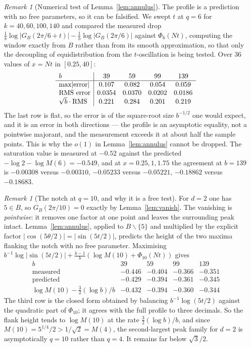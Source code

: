 \documentclass[11pt,a4paper]{article}
\theoremstyle{plain}
\theoremstyle{definition}
\theoremstyle{remark}
\newtheorem{remark}[theorem]{Remark}
\begin{document}
\begin{remark}[Numerical test of Lemma~\ref{lem:annulus}]\label{rem:profile}
The profile is a prediction with no free parameters, so it can be falsified. We
swept $t$ at $q=6$ for $k=40,60,100,140$ and compared the measured drop
$\tfrac1b\log|G_B(2\pi/6+t)|-\tfrac1b\log|G_B(2\pi/6)|$ against
$\Phi_6(Nt)$, computing the window exactly from $B$ rather than from its
smooth approximation, so that only the decoupling of equidistribution from the
$t$-oscillation is being tested. Over $36$ values of $x=Nt$ in $[0.25,40]$:
\[
  \begin{array}{l|cccc}
    b & 39 & 59 & 99 & 139\\\hline
    \text{max}|{\rm error}| & 0.107 & 0.082 & 0.054 & 0.059\\
    \text{RMS error} & 0.0354 & 0.0370 & 0.0202 & 0.0186\\
    \sqrt b\cdot\text{RMS} & 0.221 & 0.284 & 0.201 & 0.219
  \end{array}
\]
The last row is flat, so the error is of the square-root size $b^{-1/2}$ one
would expect, and it is an error in both directions --- the profile is an
asymptotic equality, not a pointwise majorant, and the measurement exceeds it at
about half the sample points. This is why the $o(1)$ in
Lemma~\ref{lem:annulus} cannot be dropped. The saturation value is measured at
$-0.52$ against the predicted $-\log2-\log M(6)=-0.549$, and at $x=0.25,1,1.75$
the agreement at $b=139$ is $-0.00308$ versus $-0.00310$, $-0.05233$ versus
$-0.05221$, $-0.18862$ versus $-0.18683$.
\end{remark}

\begin{remark}[The notch at $q=10$, and why it is a free test]\label{rem:notch}
For $d=2$ one has $5\in B$, so $G_B(2\pi/10)=0$ exactly by
Lemma~\ref{lem:vanish}. The vanishing is \emph{pointwise}: it removes one factor
at one point and leaves the surrounding peak intact. Lemma~\ref{lem:annulus},
applied to $B\smallsetminus\{5\}$ and multiplied by the explicit factor
$|\cos(5\theta/2)|=|\sin(5t/2)|$, predicts the height of the two maxima flanking
the notch with no free parameter. Maximising
$b^{-1}\log|\sin(5t/2)|+\tfrac{b-1}{b}(\log M(10)+\Phi_{10}(Nt))$ gives
\[
  \begin{array}{l|cccc}
    b & 39 & 59 & 99 & 139\\\hline
    \text{measured} & -0.446 & -0.404 & -0.366 & -0.351\\
    \text{predicted} & -0.429 & -0.394 & -0.361 & -0.345\\
    \log M(10)-\tfrac32(\log b)/b & -0.432 & -0.394 & -0.360 & -0.344
  \end{array}
\]
The third row is the closed form obtained by balancing $b^{-1}\log(5t/2)$
against the quadratic part of $\Phi_{10}$; it agrees with the full profile to
three decimals. So the flank height tends to $\log M(10)$ at the rate
$\tfrac32(\log b)/b$, and since $M(10)=5^{1/4}/2>1/\sqrt2=M(4)$, the
second-largest peak family for $d=2$ is asymptotically $q=10$ rather than $q=4$.
It remains far below $\sqrt3/2$.
\end{remark}
\end{document}
